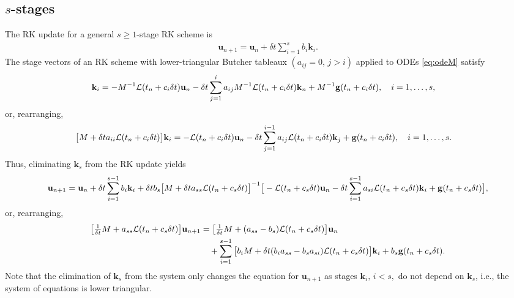 \documentclass[a4paper,10pt]{article}
\begin{document}
\subsection{$s$-stages}
The RK update for a general $s \geq 1$-stage RK scheme is
\begin{align*}
\mathbf{u}_{n+1} = \mathbf{u}_{n} + \delta t \sum \limits_{i = 1}^s b_i \mathbf{k}_i.
\end{align*}
The stage vectors of an RK scheme with lower-triangular Butcher tableaux $(a_{ij} = 0, \, j > i)$ applied to ODEs \eqref{eq:odeM} satisfy
\begin{align*}
\mathbf{k}_i 
&= 
- M^{-1} {\cal L}(t_n + c_i \delta t) \mathbf{u}_{n} 
- \delta t \sum \limits_{j = 1}^{i} a_{ij} M^{-1} {\cal L}(t_n + c_i \delta t) \mathbf{k}_{n} 
+ M^{-1} \mathbf{g}(t_n + c_i \delta t),
\quad
i = 1,\ldots,s,
\end{align*}
or, rearranging,
\begin{align*}
\big[ M + \delta t a_{ii} {\cal L}(t_n + c_i \delta t) \big] \mathbf{k}_i 
&= 
- {\cal L}(t_n + c_i \delta t) \mathbf{u}_{n} 
- \delta t \sum \limits_{j = 1}^{i-1} a_{ij} {\cal L}(t_n + c_i \delta t) \mathbf{k}_{j} 
+ \mathbf{g}(t_n + c_i \delta t),
\quad
i = 1,\ldots,s.
\end{align*}
Thus, eliminating $\mathbf{k}_s$ from the RK update yields
\begin{align*}
\mathbf{u}_{n+1} 
= 
\mathbf{u}_{n} + \delta t \sum \limits_{i = 1}^{s-1} b_i \mathbf{k}_i
+ \delta t b_s 
\big[ 
M + \delta t a_{ss} {\cal L}(t_n + c_s \delta t) 
\big]^{-1}
\big[
- {\cal L}(t_n + c_s \delta t) \mathbf{u}_{n} 
- \delta t \sum \limits_{i = 1}^{s-1} a_{si} {\cal L}(t_n + c_s \delta t) \mathbf{k}_{i} 
+ \mathbf{g}(t_n + c_s \delta t)
\big],
\end{align*}
or, rearranging,
\begin{align*}
\big[ 
\tfrac{1}{\delta t} M + a_{ss} {\cal L}(t_n + c_s \delta t) 
\big] 
\mathbf{u}_{n+1} 
&= 
\big[ 
\tfrac{1}{\delta t} M + ( a_{ss} - b_s) {\cal L}(t_n + c_s \delta t) 
\big] 
\mathbf{u}_{n} \\
&\quad
+ \sum \limits_{i = 1}^{s-1} 
\big[
b_i M + \delta t  (b_i a_{ss} - b_s a_{si}) {\cal L}(t_n + c_s \delta t)
\big] \mathbf{k}_i
+
b_s \mathbf{g}(t_n + c_s \delta t).
\end{align*}
Note that the elimination of $\mathbf{k}_s$ from the system only changes the equation for $\mathbf{u}_{n+1}$ as stages $\mathbf{k}_i, \, i < s,$ do not depend on $\mathbf{k}_s$, i.e., the system of equations is lower triangular.
\end{document}
